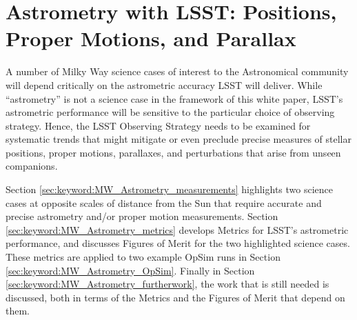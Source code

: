 \section{Astrometry with LSST: Positions, Proper Motions, and Parallax}
\def\secname{MW_Astrometry}\label{sec:\secname} %


A number of Milky Way science cases of interest to the Astronomical
community will depend critically on the astrometric accuracy LSST will
deliver. While ``astrometry'' is not a science case in the framework
of this white paper, LSST's astrometric performance will be sensitive
to the particular choice of observing strategy.
Hence, the LSST Observing Strategy needs to be examined for systematic
trends that might mitigate or even preclude precise measures of
stellar positions, proper motions, parallaxes, and perturbations that
arise from unseen companions.

Section \ref{sec:keyword:MW_Astrometry_measurements} highlights two
science cases at opposite scales of distance from the Sun that require
accurate and precise astrometry and/or proper motion
measurements. Section \ref{sec:keyword:MW_Astrometry_metrics} develops
Metrics for LSST's astrometric performance, and discusses Figures of
Merit for the two highlighted science cases. These metrics are applied to two example OpSim runs in
Section \ref{sec:keyword:MW_Astrometry_OpSim}. Finally in Section
\ref{sec:keyword:MW_Astrometry_furtherwork}, the work that is still
needed is discussed, both in terms of the Metrics and the Figures of
Merit that depend on them.



